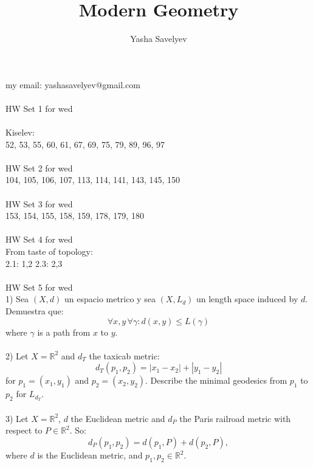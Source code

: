 \documentclass{amsart}
\title{Modern Geometry}
\author{Yasha Savelyev}
\begin{document}
\maketitle
\section{}
my email: yashasavelyev@gmail.com
\\\\
HW Set 1 for wed
\\\\
Kiselev: 
\\
52, 53, 55, 60, 61, 67, 69, 75, 79, 89, 96, 97
\\\\
HW Set 2 for wed
\\
104, 105, 106, 107, 113, 114, 141, 143, 145, 150
\\\\
HW Set 3 for wed
\\
153, 154, 155, 158, 159, 178, 179, 180
\\\\
HW Set 4 for wed
\\
From taste of topology:
\\
2.1: 1,2 
2.3: 2,3 
\\\\
HW Set 5 for wed
\\
1) Sea $(X, d) $ un espacio metrico y sea $(X, L _{d})$ un length space induced by $d$. Demuestra que: $$\forall x,y \, \forall \gamma: d (x,y) \leq L (\gamma)$$ where $\gamma$  is a path from $x$ to $y$. 
\\\\
2) Let $X = \mathbb{R} ^{2}$ and $d _{T}$ the taxicab metric:
$$d _{T} (p _{1}, p _{2}) = |x _{1} - x _{2}| + |y _{1} - y _{2}|$$ for $p _{1} = (x _{1}, y _{1}) $ and $p _{2} = (x _{2}, y _{2})$.
Describe the minimal geodesics from $p _{1}$ to $p _{2}$ for $L _{d _{T}}$. 
\\\\
3) Let $X = \mathbb{R} ^{2}$, $d$  the Euclidean metric and
$d _{P}$ the Paris railroad metric with respect to $P \in
\mathbb{R} ^{2}$. So:
\begin{equation*}
d _{P} (p _{1}, p _{2}) = d (p _{1}, P) + d (p _{2}, P),
\end{equation*}
where $d$ is the Euclidean metric, and $p _{1}, p _{2} \in
\mathbb{R} ^{2} $.
\end{document}
